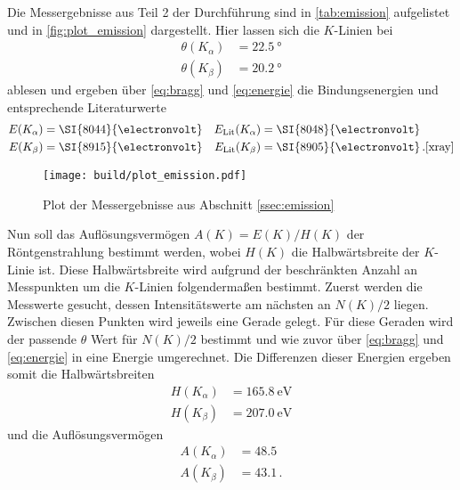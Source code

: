Die Messergebnisse aus Teil 2 der Durchführung sind in \autoref{tab:emission} aufgelistet und in \autoref{fig:plot_emission} dargestellt.
Hier lassen sich die $K$-Linien bei
\begin{align*}
    \theta(K_\alpha) &= \SI{22.5}{\degree} \\
    \theta(K_\beta) &= \SI{20.2}{\degree}
\end{align*}
ablesen und ergeben über \autoref{eq:bragg} und \ref{eq:energie} die Bindungsenergien und entsprechende Literaturwerte
\begin{align*}
    E(K_\alpha) &= \SI{8044}{\electronvolt} & E_\text{Lit}(K_\alpha) &= \SI{8048}{\electronvolt} \\
    E(K_\beta) &= \SI{8915}{\electronvolt} & E_\text{Lit}(K_\beta) &= \SI{8905}{\electronvolt} \,.\text{\cite{xray}}
\end{align*}

\begin{figure}
    \centering
    \texttt{[image: build/plot\_emission.pdf]}
    \caption{Plot der Messergebnisse aus Abschnitt \ref{ssec:emission}}
    \label{fig:plot_emission}
\end{figure}

Nun soll das Auflösungsvermögen $A(K)=E(K)/H(K)$ der Röntgenstrahlung bestimmt werden, wobei $H(K)$ die Halbwärtsbreite der $K$-Linie ist.
Diese Halbwärtsbreite wird aufgrund der beschränkten Anzahl an Messpunkten um die $K$-Linien folgendermaßen bestimmt.
Zuerst werden die Messwerte gesucht, dessen Intensitätswerte am nächsten an $N(K)/2$ liegen.
Zwischen diesen Punkten wird jeweils eine Gerade gelegt.
Für diese Geraden wird der passende $\theta$ Wert für $N(K)/2$ bestimmt und wie zuvor über \autoref{eq:bragg} und \autoref{eq:energie} in eine Energie umgerechnet.
Die Differenzen dieser Energien ergeben somit die Halbwärtsbreiten
\begin{align*}
    H(K_\alpha) &= \SI{165.8}{\electronvolt} \\
    H(K_\beta) &= \SI{207.0}{\electronvolt}
\end{align*}
und die Auflösungsvermögen
\begin{align*}
    A(K_\alpha) &= \num{48.5} \\
    A(K_\beta) &= \num{43.1} \,.
\end{align*}

